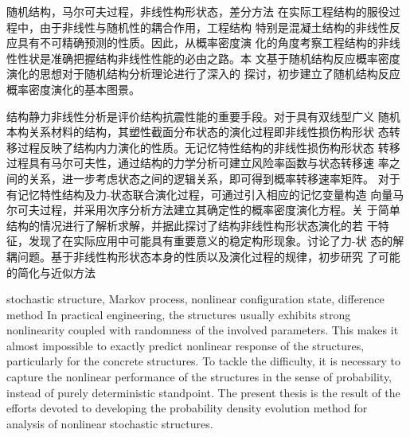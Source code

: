 \begin{cnabstract}{随机结构，马尔可夫过程，非线性构形状态，差分方法}
在实际工程结构的服役过程中，由于非线性与随机性的耦合作用，工程结构
特别是混凝土结构的非线性反应具有不可精确预测的性质。因此，从概率密度演
化的角度考察工程结构的非线性性状是准确把握结构非线性性能的必由之路。本
文基于随机结构反应概率密度演化的思想对于随机结构分析理论进行了深入的
探讨，初步建立了随机结构反应概率密度演化的基本图景。

结构静力非线性分析是评价结构抗震性能的重要手段。对于具有双线型广义
随机本构关系材料的结构，其塑性截面分布状态的演化过程即非线性损伤构形状
态转移过程反映了结构内力演化的性质。无记忆特性结构的非线性损伤构形状态
转移过程具有马尔可夫性，通过结构的力学分析可建立风险率函数与状态转移速
率之间的关系，进一步考虑状态之间的逻辑关系，即可得到概率转移速率矩阵。
对于有记忆特性结构及力-状态联合演化过程，可通过引入相应的记忆变量构造
向量马尔可夫过程，并采用次序分析方法建立其确定性的概率密度演化方程。关
于简单结构的情况进行了解析求解，并据此探讨了结构非线性构形状态演化的若
干特征，发现了在实际应用中可能具有重要意义的稳定构形现象。讨论了力-状
态的解耦问题。基于非线性构形状态本身的性质以及演化过程的规律，初步研究
了可能的简化与近似方法
\end{cnabstract}

\begin{enabstract}{stochastic structure, Markov process, nonlinear configuration state,
difference method}
In practical engineering, the structures usually exhibits strong nonlinearity
coupled with randomness of the involved parameters. This makes it almost impossible
to exactly predict nonlinear response of the structures, particularly for the concrete
structures. To tackle the difficulty, it is necessary to capture the nonlinear performance
of the structures in the sense of probability, instead of purely deterministic standpoint.
The present thesis is the result of the efforts devoted to developing the probability
density evolution method for analysis of nonlinear stochastic structures.
\end{enabstract}
